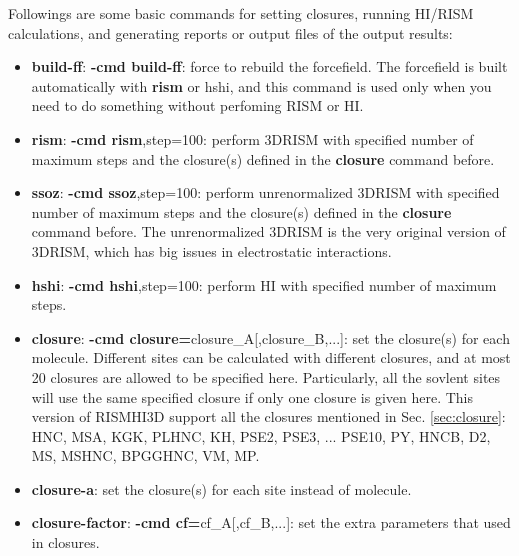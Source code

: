 \documentclass[aip,amsmath,amssymb,reprint,onecolumn]{revtex4-1}
\begin{document}
Followings are some basic commands for setting closures, running HI/RISM calculations, and generating reports or output files of the output results:

\begin{itemize}
    \item {\bf build-ff}: {\bf -cmd build-ff}: force to rebuild the forcefield. The forcefield is built automatically with {\bf rism} or {\rm hshi}, and this command is used only when you need to do something without perfoming RISM or HI.

    \item {\bf rism}: {\bf -cmd rism},step=100: perform 3DRISM with specified number of maximum steps and the closure(s) defined in the {\bf closure} command before.
    \item {\bf ssoz}: {\bf -cmd ssoz},step=100: perform unrenormalized 3DRISM with specified number of maximum steps and the closure(s) defined in the {\bf closure} command before. The unrenormalized 3DRISM is the very original version of 3DRISM, which has big issues in electrostatic interactions.
    \item {\bf hshi}: {\bf -cmd hshi},step=100: perform HI with specified number of maximum steps.

    \item {\bf closure}: {\bf -cmd closure=}closure\_A[,closure\_B,...]: set the closure(s) for each molecule. Different sites can be calculated with different closures, and at most 20 closures are allowed to be specified here. Particularly, all the sovlent sites will use the same specified closure if only one closure is given here. This version of RISMHI3D support all the closures mentioned in Sec. \ref{sec:closure}: HNC, MSA, KGK, PLHNC, KH, PSE2, PSE3, ... PSE10, PY, HNCB, D2, MS, MSHNC, BPGGHNC, VM, MP.
    \item {\bf closure-a}: set the closure(s) for each site instead of molecule.
    \item {\bf closure-factor}: {\bf -cmd cf=}cf\_A[,cf\_B,...]: set the extra parameters that used in closures.


\end{itemize}
\end{document}
